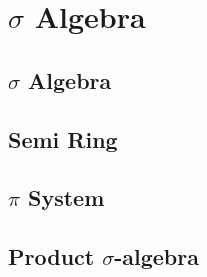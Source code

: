 \chapter{$\sigma$ Algebra}

\section{$\sigma$ Algebra}

\section{Semi Ring}

\section{$\pi$ System}

\section{Product $\sigma$-algebra}













